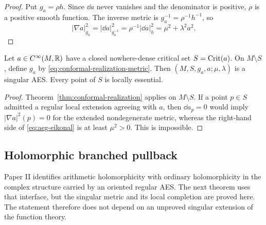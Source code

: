 \begin{proof}
Put $g_a=\rho h$.  Since $\dd a$ never vanishes and the denominator is positive,
$\rho$ is a positive smooth function.  The inverse metric is
$g_a^{-1}=\rho^{-1}h^{-1}$, so
\[
 |\nabla a|_{g_a}^2=|\dd a|_{g_a^{-1}}^2
 =\rho^{-1}|\dd a|_h^2
 =\mu^2+\lambda^2a^2.
\]
\end{proof}

\begin{corollary}
\label{cor:singular-realization}
Let $a\in C^\infty(M,\mathbb{R})$ have a closed nowhere-dense critical set
$S=\operatorname{Crit}(a)$.  On $M\setminus S$, define $g_a$ by
\eqref{eq:conformal-realization-metric}.  Then
$(M,S,g_a,a;\mu,\lambda)$ is a singular AES.  Every point of $S$ is locally
essential.
\end{corollary}

\begin{proof}
Theorem~\ref{thm:conformal-realization} applies on $M\setminus S$.  If a point
$p\in S$ admitted a regular local extension agreeing with $a$, then
$\dd a_p=0$ would imply $|\nabla a|^2(p)=0$ for the extended nondegenerate
metric, whereas the right-hand side of \eqref{eq:aeg-eikonal} is at least
$\mu^2>0$.  This is impossible.
\end{proof}

\subsection{Holomorphic branched pullback}

Paper II identifies arithmetic holomorphicity with ordinary holomorphicity in
the complex structure carried by an oriented regular AES.  The next theorem uses
that interface, but the singular metric and its local completion are proved here.
The statement therefore does not depend on an unproved singular extension of the
function theory.

